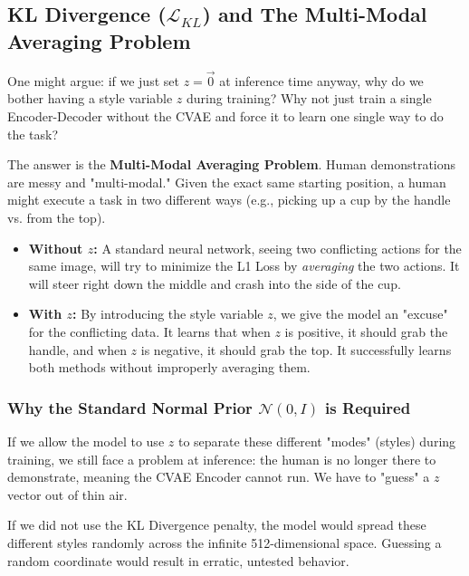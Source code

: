 \documentclass[11pt,a4paper]{article}
\begin{document}
\subsection{KL Divergence ($\mathcal{L}_{KL}$) and The Multi-Modal Averaging Problem}
One might argue: if we just set $z=\vec{0}$ at inference time anyway, why do we bother having a style variable $z$ during training? Why not just train a single Encoder-Decoder without the CVAE and force it to learn one single way to do the task?

The answer is the \textbf{Multi-Modal Averaging Problem}. Human demonstrations are messy and "multi-modal." Given the exact same starting position, a human might execute a task in two different ways (e.g., picking up a cup by the handle vs. from the top). 
\begin{itemize}
    \item \textbf{Without $z$:} A standard neural network, seeing two conflicting actions for the same image, will try to minimize the L1 Loss by \textit{averaging} the two actions. It will steer right down the middle and crash into the side of the cup.
    \item \textbf{With $z$:} By introducing the style variable $z$, we give the model an "excuse" for the conflicting data. It learns that when $z$ is positive, it should grab the handle, and when $z$ is negative, it should grab the top. It successfully learns both methods without improperly averaging them.
\end{itemize}

\subsubsection{Why the Standard Normal Prior $\mathcal{N}(0,I)$ is Required}
If we allow the model to use $z$ to separate these different "modes" (styles) during training, we still face a problem at inference: the human is no longer there to demonstrate, meaning the CVAE Encoder cannot run. We have to "guess" a $z$ vector out of thin air.

If we did not use the KL Divergence penalty, the model would spread these different styles randomly across the infinite 512-dimensional space. Guessing a random coordinate would result in erratic, untested behavior.
\end{document}
